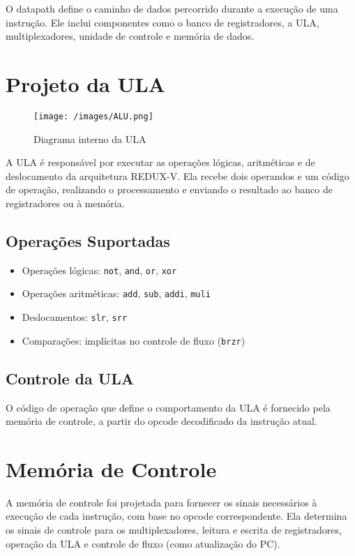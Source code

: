 \documentclass[12pt]{article}
\begin{document}
O datapath define o caminho de dados percorrido durante a execução de uma instrução. Ele inclui componentes como o banco de registradores, a ULA, multiplexadores, unidade de controle e memória de dados.

\section{Projeto da ULA}

\begin{figure}[h!]
\centering
\texttt{[image: /images/ALU.png]}
\caption{Diagrama interno da ULA}
\label{fig:ula}
\end{figure}

A ULA é responsável por executar as operações lógicas, aritméticas e de deslocamento da arquitetura REDUX-V. Ela recebe dois operandos e um código de operação, realizando o processamento e enviando o resultado ao banco de registradores ou à memória.

\subsection{Operações Suportadas}
\begin{itemize}
  \item Operações lógicas: \texttt{not}, \texttt{and}, \texttt{or}, \texttt{xor}
  \item Operações aritméticas: \texttt{add}, \texttt{sub}, \texttt{addi}, \texttt{muli}
  \item Deslocamentos: \texttt{slr}, \texttt{srr}
  \item Comparações: implícitas no controle de fluxo (\texttt{brzr})
\end{itemize}

\subsection{Controle da ULA}
O código de operação que define o comportamento da ULA é fornecido pela memória de controle, a partir do opcode decodificado da instrução atual.

\section{Memória de Controle}

A memória de controle foi projetada para fornecer os sinais necessários à execução de cada instrução, com base no opcode correspondente. Ela determina os sinais de controle para os multiplexadores, leitura e escrita de registradores, operação da ULA e controle de fluxo (como atualização do PC).
\end{document}
